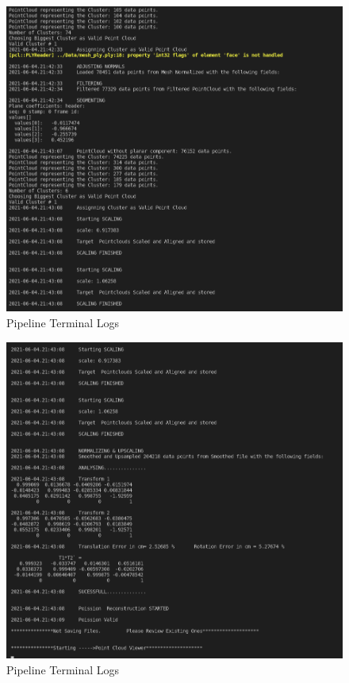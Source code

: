\documentclass[12pt]{report}
\begin{document}
\begin{figure}[H]%
  \centering
  \includegraphics[width=1\textwidth]{log2.png}
\caption{Pipeline Terminal Logs}
\label{fig:log2}
\end{figure}

\begin{figure}[H]%
  \centering
  \includegraphics[width=1\textwidth]{log3.png}
\caption{Pipeline Terminal Logs}
\label{fig:log3}
\end{figure}


\end{document}
